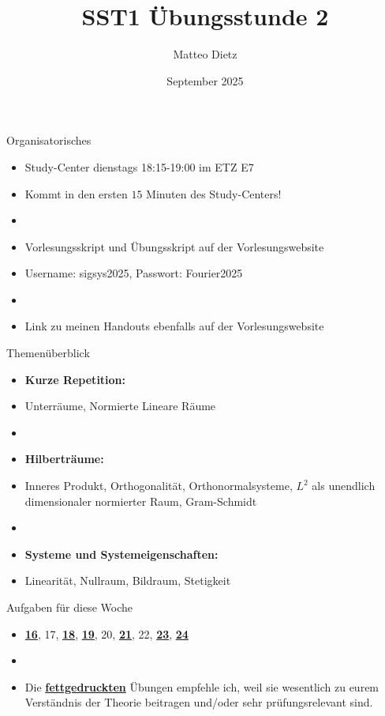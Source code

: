 \documentclass[14pt, aspectratio=169, handout]{beamer}
\title{SST1 Übungsstunde 2}
\author{Matteo Dietz}
\date{September 2025}
\begin{document}
\maketitle

\begin{frame}{Organisatorisches}
    \begin{itemize}
        \item \alert{Study-Center dienstags 18:15-19:00 im ETZ E7}
        \item[] Kommt in den ersten $15$ Minuten des Study-Centers!
        \item[]
        \item Vorlesungsskript und Übungsskript auf der Vorlesungswebsite
        \item[] Username: sigsys2025, \hspace{10pt} Passwort: Fourier2025
        \item[] 
        \item Link zu meinen Handouts ebenfalls auf der Vorlesungswebsite
    \end{itemize}
\end{frame}

\begin{frame}{Themenüberblick}
    \begin{itemize}
    \item \textbf{Kurze Repetition:}
    \item[] Unterräume, Normierte Lineare Räume
    \item[] 
    \item \textbf{Hilberträume:}
    \item[] Inneres Produkt, Orthogonalität, Orthonormalsysteme, $L^2$ als unendlich dimensionaler normierter Raum, Gram-Schmidt
    \item[] 
    \item \textbf{Systeme und Systemeigenschaften:}
    \item[] Linearität, Nullraum, Bildraum, Stetigkeit
\end{itemize}
\end{frame}

\begin{frame}{Aufgaben für diese Woche}
    \begin{itemize}
        \item[] \underline{\textbf{16}}, 17, \underline{\textbf{18}}, \underline{\textbf{19}}, 20, \underline{\textbf{21}}, 22, \underline{\textbf{23}}, \underline{\textbf{24}}
        \item[] 
        \item[] Die \underline{\textbf{fettgedruckten}} Übungen empfehle ich, weil sie wesentlich zu eurem Verständnis der Theorie beitragen und/oder sehr prüfungsrelevant sind.
    \end{itemize}
\end{frame}
\end{document}
